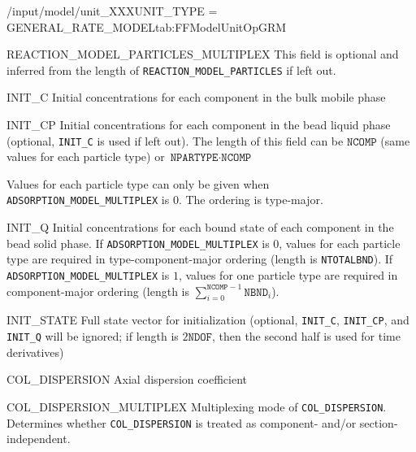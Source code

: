 \begin{condsubgroup}{/input/model/unit\_XXX}{UNIT\_TYPE = GENERAL\_RATE\_MODEL}{tab:FFModelUnitOpGRM}
\begin{dataset}[unit=--,type=int,range={$\{0, 1\}$},length={1}]{REACTION\_MODEL\_PARTICLES\_MULTIPLEX}
    This field is optional and inferred from the length of \texttt{REACTION\_MODEL\_PARTICLES} if left out.
  \end{dataset}
  \begin{dataset}[unit=\si{\mol\per\cubic\metre\of{IV}},type=double,range={$\geq 0$},length={\texttt{NCOMP}}]{INIT\_C}
    Initial concentrations for each component in the bulk mobile phase
  \end{dataset}
  \begin{dataset}[unit=\si{\mol\per\cubic\metre\of{MP}},type=double,range={$\geq 0$},length={\texttt{NCOMP} / $\texttt{NPARTYPE} \cdot \texttt{NCOMP}$}]{INIT\_CP}
    Initial concentrations for each component in the bead liquid phase (optional, \texttt{INIT\_C} is used if left out).
    The length of this field can be $\texttt{NCOMP}$ (same values for each particle type) or $\texttt{NPARTYPE} \cdot \texttt{NCOMP}$

    Values for each particle type can only be given when \texttt{ADSORPTION\_MODEL\_MULTIPLEX} is $0$.
    The ordering is type-major.
  \end{dataset}
  \begin{dataset}[unit=\si{\mol\per\cubic\metre\of{SP}},type=double,range={$\geq 0$},length={\texttt{NTOTALBND} / $\sum_{i = 0}^{\texttt{NCOMP} - 1} \texttt{NBND}_i$}]{INIT\_Q}
    Initial concentrations for each bound state of each component in the bead solid phase.
    If \texttt{ADSORPTION\_MODEL\_MULTIPLEX} is $0$, values for each particle type are required in type-component-major ordering (length is \texttt{NTOTALBND}).
    If \texttt{ADSORPTION\_MODEL\_MULTIPLEX} is $1$, values for one particle type are required in component-major ordering (length is $\sum_{i = 0}^{\texttt{NCOMP} - 1} \texttt{NBND}_i$).
  \end{dataset}
  \begin{dataset}[unit=various,type=double,range={$\mathds{R}$},length={\texttt{NDOF} / $2\texttt{NDOF}$}]{INIT\_STATE}
    Full state vector for initialization (optional, \texttt{INIT\_C}, \texttt{INIT\_CP}, and \texttt{INIT\_Q} will be ignored; if length is $2\texttt{NDOF}$, then the second half is used for time derivatives)
  \end{dataset}
  \begin{dataset}[unit=\si{\square\metre\of{IV}\per\second},type=double,range={$\geq 0$},length={see \texttt{COL\_DISPERSION\_MULTIPLEX}}]{COL\_DISPERSION}
    Axial dispersion coefficient
  \end{dataset}
  \begin{dataset}[unit=--,type=int,range={$\{0, \dots, 3 \}$},length={1}]{COL\_DISPERSION\_MULTIPLEX}
    Multiplexing mode of \texttt{COL\_DISPERSION}.
    Determines whether \texttt{COL\_DISPERSION} is treated as component- and/or section-independent.


\end{dataset}
\end{condsubgroup}
